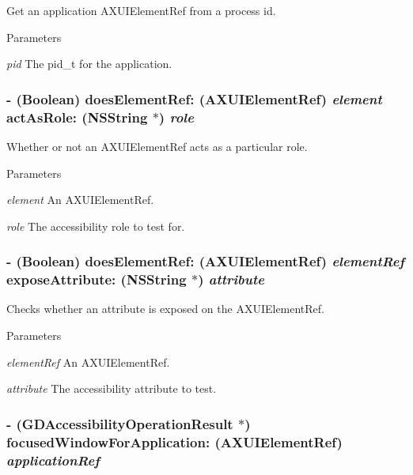 Get an application AXUIElementRef from a process id. 
\begin{DoxyParams}{Parameters}
\item[{\em pid}]The pid\_\-t for the application. \end{DoxyParams}
\hypertarget{interface_g_d_accessibility_manager_ab01d89443568416b034e6a8750106ddb}{
\subsubsection[{doesElementRef:actAsRole:}]{\setlength{\rightskip}{0pt plus 5cm}-\/ (Boolean) doesElementRef: (AXUIElementRef) {\em element}\/ actAsRole: ({\bf NSString} $\ast$) {\em role}}}
\label{interface_g_d_accessibility_manager_ab01d89443568416b034e6a8750106ddb}


Whether or not an AXUIElementRef acts as a particular role. 
\begin{DoxyParams}{Parameters}
\item[{\em element}]An AXUIElementRef. \item[{\em role}]The accessibility role to test for. \end{DoxyParams}
\hypertarget{interface_g_d_accessibility_manager_ad3fc09b2e6330989ea5bc28ba1ecdc9d}{
\subsubsection[{doesElementRef:exposeAttribute:}]{\setlength{\rightskip}{0pt plus 5cm}-\/ (Boolean) doesElementRef: (AXUIElementRef) {\em elementRef}\/ exposeAttribute: ({\bf NSString} $\ast$) {\em attribute}}}
\label{interface_g_d_accessibility_manager_ad3fc09b2e6330989ea5bc28ba1ecdc9d}


Checks whether an attribute is exposed on the AXUIElementRef. 
\begin{DoxyParams}{Parameters}
\item[{\em elementRef}]An AXUIElementRef. \item[{\em attribute}]The accessibility attribute to test. \end{DoxyParams}
\hypertarget{interface_g_d_accessibility_manager_a91408e0f939f8976ee81b2883ecfeac2}{
\subsubsection[{focusedWindowForApplication:}]{\setlength{\rightskip}{0pt plus 5cm}-\/ ({\bf GDAccessibilityOperationResult} $\ast$) focusedWindowForApplication: (AXUIElementRef) {\em applicationRef}}}
\label{interface_g_d_accessibility_manager_a91408e0f939f8976ee81b2883ecfeac2}


